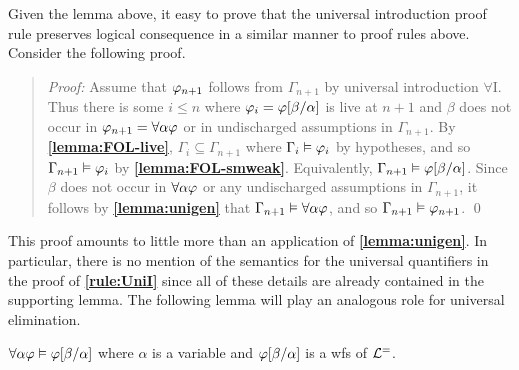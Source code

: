 Given the lemma above, it easy to prove that the universal introduction proof rule preserves logical consequence in a similar manner to proof rules above.
Consider the following proof.





\begin{quote} 
  \textit{Proof:} Assume that $\varphi_{n+1}$ follows from $\Gamma_{n+1}$ by universal introduction $\forall$I.
  Thus there is some $i\leq n$ where $\varphi_i=\varphi[\beta/\alpha]$ is live at $n+1$ and $\beta$ does not occur in $\varphi_{n+1}=\forall \alpha\varphi$ or in undischarged assumptions in $\Gamma_{n+1}$.
  By \textbf{\ref{lemma:FOL-live}}, $\Gamma_i\subseteq \Gamma_{n+1}$ where $\Gamma_i\vDash\varphi_i$ by hypotheses, and so $\Gamma_{n+1} \vDash \varphi_i$ by \textbf{\ref{lemma:FOL-smweak}}.
  Equivalently, $\Gamma_{n+1} \vDash \varphi[\beta/\alpha]$.
  Since $\beta$ does not occur in $\forall \alpha\varphi$ or any undischarged assumptions in $\Gamma_{n+1}$, it follows by \textbf{\ref{lemma:unigen}} that $\Gamma_{n+1}\vDash \forall \alpha\varphi$, and so $\Gamma_{n+1}\vDash\varphi_{n+1}$.
  \qed
\end{quote}

This proof amounts to little more than an application of \textbf{\ref{lemma:unigen}}.
In particular, there is no mention of the semantics for the universal quantifiers in the proof of \textbf{\ref{rule:UniI}} since all of these details are already contained in the supporting lemma.
The following lemma will play an analogous role for universal elimination.



\begin{Lthm} \label{lemma:uniinst}
  $\forall\alpha\varphi \vDash \varphi[\beta/\alpha]$ where $\alpha$ is a variable and $\varphi[\beta/\alpha]$ is a wfs of $\mathcal{L}^{=}$. 
\end{Lthm}

